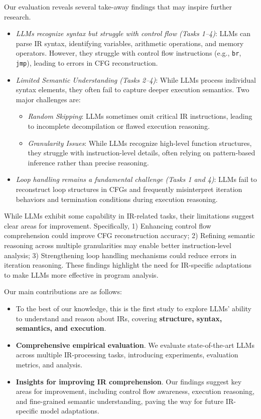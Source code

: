 Our evaluation reveals several take-away findings that may inspire further research.
\begin{itemize}[nolistsep,leftmargin=*]
    \item \emph{LLMs recognize syntax but struggle with control flow (Tasks 1--4)}: LLMs can parse IR syntax, identifying variables, arithmetic operations, and memory operators. However, they struggle with control flow instructions (e.g., \texttt{br}, \texttt{jmp}), leading to errors in CFG reconstruction.
    \item \emph{Limited Semantic Understanding (Tasks 2--4)}: While LLMs process individual syntax elements, they often fail to capture deeper execution semantics. Two major challenges are:
    \begin{itemize}[nolistsep,leftmargin=*]
        \item \emph{Random Skipping}: LLMs sometimes omit critical IR instructions, leading to incomplete decompilation or flawed execution reasoning.
        \item \emph{Granularity Issues}: While LLMs recognize high-level function structures, they struggle with instruction-level details, often relying on pattern-based inference rather than precise reasoning.
    \end{itemize}
    
    \item \emph{Loop handling remains a fundamental challenge (Tasks 1 and 4)}: LLMs fail to reconstruct loop structures in CFGs and frequently misinterpret iteration behaviors and termination conditions during execution reasoning.
\end{itemize}

While LLMs exhibit some capability in IR-related tasks, their limitations suggest clear areas for improvement. Specifically, 1) Enhancing control flow comprehension could improve CFG reconstruction accuracy; 2) Refining semantic reasoning across multiple granularities may enable better instruction-level analysis; 3) Strengthening loop handling mechanisms could reduce errors in iteration reasoning.
These findings highlight the need for IR-specific adaptations to make LLMs more effective in program analysis.


Our main contributions are as follows:

\begin{itemize}[nolistsep,leftmargin=*]
    \item To the best of our knowledge, this is the first study to explore LLMs' ability to understand and reason about IRs, covering \textbf{structure, syntax, semantics, and execution}.
    \item \textbf{Comprehensive empirical evaluation}.  
    We evaluate state-of-the-art LLMs across multiple IR-processing tasks, introducing experiments, evaluation metrics, and analysis.

    \item \textbf{Insights for improving IR comprehension}.  
    Our findings suggest key areas for improvement, including control flow awareness, execution reasoning, and fine-grained semantic understanding, paving the way for future IR-specific model adaptations.

\end{itemize}
